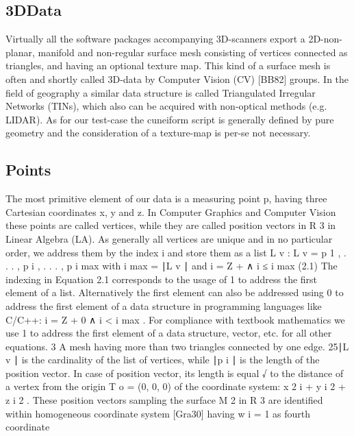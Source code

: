 \documentclass[openany]{book}
\begin{document}
\subsection{3DData}
Virtually all the software packages accompanying 3D-scanners export
a 2D-non-planar, manifold and non-regular surface mesh consisting of vertices 
connected as triangles, and having an optional texture map. This kind of a
surface mesh is often and shortly called 3D-data by Computer Vision (CV) [BB82]
groups. In the field of geography a similar data structure is called
Triangulated Irregular Networks (TINs), which also can be acquired with
non-optical methods (e.g. LIDAR). As for our test-case the cuneiform script is
generally defined by pure geometry and the consideration of a texture-map is
per-se not necessary.~\cite[p.~25]{Mara12}

\subsection{Points}
The most primitive element of our data is a measuring point p, having three 
Cartesian coordinates x, y and z. In Computer Graphics and Computer Vision these 
points are called vertices, while they are called position vectors in R 3 in 
Linear Algebra (LA). As generally all vertices are unique and in no particular 
order, we address them by the index i and store them as a list L v :
L v = { p 1 , . . . , p i , . . . , p i max } with i max = ∣L v ∣ and i = Z + ∧ 
i ≤ i max (2.1)
The indexing in Equation 2.1 corresponds to the usage of 1 to address the first 
element of a list. Alternatively the first element can also be addressed using 0 
to address the first element of a data structure in programming languages like 
C/C++: i = Z + 0 ∧ i < i max . For compliance with textbook mathematics we use 1 
to address the first element of a data structure, vector, etc. for all other 
equations. 3 A mesh having more than two triangles connected by one edge. 25∣L v 
∣ is the cardinality of the list of vertices, while ∣p i ∣ is the length of the 
position vector.
In case of position vector, its length is equal
√ to the distance of a vertex from the origin
T
o = (0, 0, 0) of the coordinate system: x 2 i + y i 2 + z i 2 . These position 
vectors sampling the surface M 2 in R 3 are identified within homogeneous 
coordinate system [Gra30] having
w i = 1 as fourth coordinate~\cite[p.~25-26]{Mara12}
\end{document}
